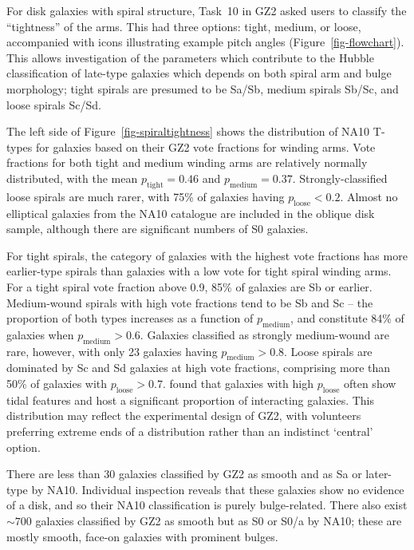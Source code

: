 \documentclass[useAMS,usenatbib]{mn2e}
\begin{document}
For disk galaxies with spiral structure, Task~10 in GZ2 asked users to classify the ``tightness'' of the arms. This had three options: tight, medium, or loose, accompanied with icons illustrating example pitch angles (Figure~\ref{fig-flowchart}). This allows investigation of the parameters which contribute to the Hubble classification of late-type galaxies which depends on both spiral arm and bulge morphology; tight spirals are presumed to be Sa/Sb, medium spirals Sb/Sc, and loose spirals Sc/Sd. 

The left side of Figure~\ref{fig-spiraltightness} shows the distribution of NA10 T-types for galaxies based on their GZ2 vote fractions for winding arms. Vote fractions for both tight and medium winding arms are relatively normally distributed, with the mean $p_\mathrm{tight}=0.46$ and $p_\mathrm{medium}=0.37$. Strongly-classified loose spirals are much rarer, with 75\% of galaxies having $p_\mathrm{loose}<0.2$. Almost no elliptical galaxies from the NA10 catalogue are included in the oblique disk sample, although there are significant numbers of S0 galaxies. 

For tight spirals, the category of galaxies with the highest vote fractions has more earlier-type spirals than galaxies with a low vote for tight spiral winding arms. For a tight spiral vote fraction above 0.9, 85\% of galaxies are Sb or earlier. Medium-wound spirals with high vote fractions tend to be Sb and Sc -- the proportion of both types increases as a function of $p_\mathrm{medium}$, and constitute 84\% of galaxies when $p_\mathrm{medium}>0.6$. Galaxies classified as strongly medium-wound are rare, however, with only 23 galaxies having $p_\mathrm{medium}>0.8$.  Loose spirals are dominated by Sc and Sd galaxies at high vote fractions, comprising more than 50\% of galaxies with $p_\mathrm{loose}>0.7$. \citet{cas13} found that galaxies with high $p_\mathrm{loose}$ often show tidal features and host a significant proportion of interacting galaxies. This distribution may reflect the experimental design of GZ2, with volunteers preferring extreme ends of a distribution rather than an indistinct `central' option. 

There are less than 30 galaxies classified by GZ2 as smooth and as Sa or later-type by NA10. Individual inspection reveals that these galaxies show no evidence of a disk, and so their NA10 classification is purely bulge-related. There also exist $\sim700$ galaxies classified by GZ2 as smooth but as S0 or S0/a by NA10; these are mostly smooth, face-on galaxies with prominent bulges. 
\end{document}
